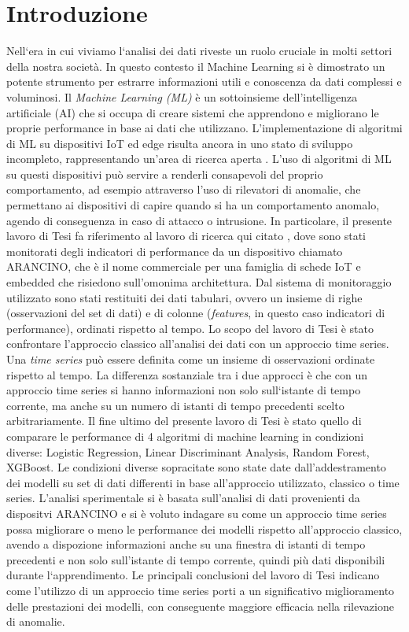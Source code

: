\chapter{Introduzione}

\medskip

Nell`era in cui viviamo l`analisi dei dati riveste un ruolo cruciale in molti settori della nostra societ\`a.
In questo contesto il Machine Learning si \`e dimostrato un potente strumento per estrarre informazioni utili e conoscenza da dati complessi e voluminosi. 
Il \textit{Machine Learning (ML)} \`e un sottoinsieme dell'intelligenza artificiale (AI) che si occupa di creare sistemi che apprendono e migliorano le proprie performance in base ai dati che utilizzano. L'implementazione di algoritmi di ML su dispositivi IoT ed edge risulta ancora in uno stato di sviluppo incompleto, rappresentando un'area di ricerca aperta \cite{zoppi}. L'uso di algoritmi di ML su questi dispositivi pu\`o servire a renderli consapevoli del proprio comportamento, ad esempio attraverso l'uso di rilevatori di anomalie, che permettano ai dispositivi di capire quando si ha un comportamento anomalo, agendo di conseguenza in caso di attacco o intrusione. In particolare, il presente lavoro di Tesi fa riferimento al lavoro di ricerca qui citato \cite{zoppi}, dove sono stati monitorati degli indicatori di performance da un dispositivo chiamato ARANCINO, che \`e il nome commerciale per una famiglia di schede IoT e embedded che risiedono sull'omonima architettura. Dal sistema di monitoraggio utilizzato sono stati restituiti dei dati tabulari, ovvero un insieme di righe (osservazioni del set di dati) e di colonne (\textit{features}, in questo caso indicatori di performance), ordinati rispetto al tempo. Lo scopo del lavoro di Tesi \`e stato confrontare l'approccio classico all'analisi dei dati con un approccio time series. 
Una \textit{time series} \cite{time_series} pu\`o essere definita come un insieme di osservazioni ordinate rispetto al tempo. La differenza sostanziale tra i due approcci \`e che con un approccio time series si hanno informazioni non solo sull`istante di tempo corrente, ma anche su un numero di istanti di tempo precedenti scelto arbitrariamente.
Il fine ultimo del presente lavoro di Tesi \`e stato quello di comparare le performance di 4 algoritmi di machine learning in condizioni diverse: Logistic Regression, Linear Discriminant Analysis, Random Forest, XGBoost.
Le condizioni diverse sopracitate sono state date dall'addestramento dei modelli su set di dati differenti in base all'approccio utilizzato, classico o time series.
L'analisi sperimentale si \`e basata sull'analisi di dati provenienti da dispositvi ARANCINO e si \`e voluto indagare su come un approccio time series possa migliorare o meno le performance dei modelli rispetto all'approccio classico, avendo a dispozione informazioni anche su una finestra di istanti di tempo precedenti e non solo sull'istante di tempo corrente, quindi pi\`u dati disponibili durante l`apprendimento. 
Le principali conclusioni del lavoro di Tesi indicano come l'utilizzo di un approccio time series porti a un significativo miglioramento delle prestazioni dei modelli, con conseguente maggiore efficacia nella rilevazione di anomalie.

